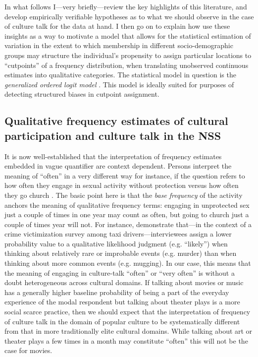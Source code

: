 \documentclass[11pt]{article}
\begin{document}
In what follows I---very briefly---review the key highlights of this literature, and develop empirically verifiable hypotheses as to what we should observe in the case of culture talk for the data at hand. I then go on to explain how use these insights as a way to motivate a model that allows for the statistical estimation of variation in the extent to which membership in different socio-demographic groups may structure the individual's propensity to assign particular locations to ``cutpoints'' of a frequency distribution, when translating unobserved continuous estimates into qualitative categories.  The statistical model in question is the \emph{generalized ordered logit model} \citep{williams05}.  This model is ideally suited for purposes of detecting structured biases in cutpoint assignment.

\subsection{Qualitative frequency estimates of cultural participation and culture talk in the NSS}
It is now well-established that the interpretation of frequency estimates embedded in vague quantifier are context dependent.  Persons interpret the meaning of ``often'' in a very different way for instance, if the question refers to how often they engage in sexual activity without protection versus how often they go church \citep[480]{wright_etal94}.  The basic point here is that the \emph{base frequency} of the activity anchors the meaning of qualitative frequency terms: engaging in unprotected sex just a couple of times in one year may count as often, but going to church just a couple of times year will not.   For instance, \citet{krumpal_etal10} demonstrate that---in the context of a crime victimization survey among taxi drivers---interviewees assign a lower probability value to a qualitative likelihood judgment (e.g. ``likely'') when thinking about relatively rare or improbable events (e.g. murder) than when thinking about more common events (e.g. mugging).  In our case, this means that the meaning of engaging in culture-talk ``often'' or ``very often'' is without a doubt heterogeneous across cultural domains. If talking about movies or music has a generally higher baseline probability of being a part of the everyday experience of the modal respondent but talking about theater plays is a more social scarce practice, then we should expect that the interpretation of frequency of culture talk in the domain of popular culture to be systematically different from that in more traditionally elite cultural domains.   While talking about art or theater plays a few times in a month may constitute ``often'' this will not be the case for movies. 
\end{document}
